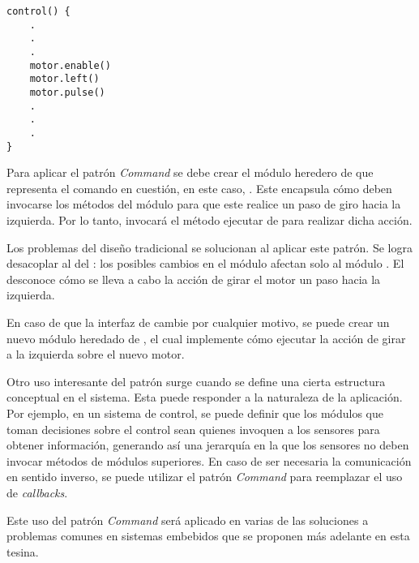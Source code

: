 \begin{lstlisting}[label={notCommand}, caption=Ejemplo de implementación sin usar el patrón \textit{Command}.]
control() {
    .
    .
    .
    motor.enable()
    motor.left()
    motor.pulse()
    .
    .
    .  
}
\end{lstlisting}
Para aplicar el patrón \textit{Command} se debe crear el módulo heredero de \Orden que representa el comando en cuestión, en este caso, \MotorGirarIzq. Este encapsula cómo deben invocarse los métodos del módulo \Motor para que este realice un paso de giro hacia la izquierda. Por lo tanto, \Controller invocará el método ejecutar de \MotorGirarIzq para realizar dicha acción.

Los problemas del diseño tradicional se solucionan al aplicar este patrón. Se logra desacoplar al \Motor del \Controller: los posibles cambios en el módulo \Motor afectan solo al módulo \MotorGirarIzq. El \Controller desconoce cómo se lleva a cabo la acción de girar el motor un paso hacia la izquierda.

En caso de que la interfaz de \Motor cambie por cualquier motivo, se puede crear un nuevo módulo heredado de \Orden, el cual implemente cómo ejecutar la acción de girar a la izquierda sobre el nuevo motor.

Otro uso interesante del patrón surge cuando se define una cierta estructura conceptual en el sistema. Esta puede responder a la naturaleza de la aplicación. Por ejemplo, en un sistema de control, se puede definir que los módulos que toman decisiones sobre el control sean quienes invoquen a los sensores para obtener información, generando así una jerarquía en la que los sensores no deben invocar métodos de módulos superiores. En caso de ser necesaria la comunicación en sentido inverso, se puede utilizar el patrón \textit{Command} para reemplazar el uso de \textit{callbacks}.

Este uso del patrón \textit{Command} será aplicado en varias de las soluciones a problemas comunes en sistemas embebidos que se proponen más adelante en esta tesina.